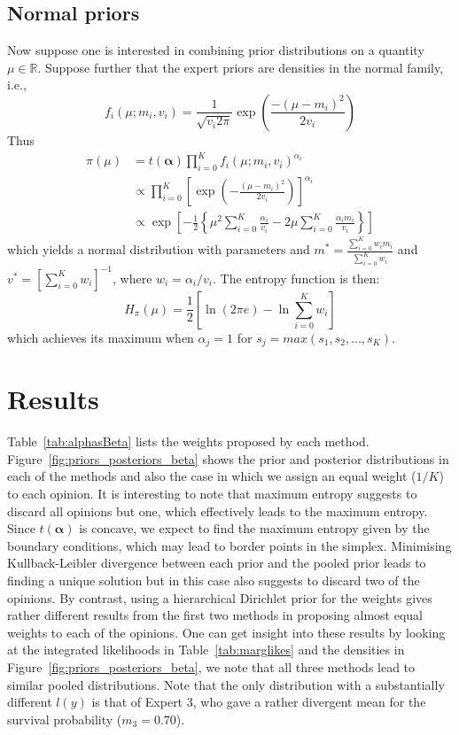 \documentclass[a4paper, notitlepage, 10pt]{article}
\begin{document}
\subsection*{Normal priors} %
\label{sec:normal}
Now suppose one is interested in combining prior distributions on a quantity $\mu \in \mathbb{R}$.
Suppose further that the expert priors are densities in the normal family, i.e.,
$$ f_i(\mu; m_i, v_i) = \frac{1}{\sqrt{v_i2\pi}} \exp\left(\frac{-(\mu-m_i)^2}{2v_i}\right) $$
Thus 
\begin{align}
\pi(\mu)&= t(\boldsymbol\alpha)\prod_{i=0}^{K}f_i(\mu; m_i, v_i)^{\alpha_i}\\
 &\propto \prod_{i=0}^{K} \left[ \exp \left(-\frac{(\mu-m_i)^2}{2v_i} \right) \right]^{\alpha_i} \\
&\propto \exp\left[-\frac{1}{2}\left\{\mu^2 \sum_{i=0}^K\frac{\alpha_i}{v_i} - 2 \mu \sum_{i=0}^K \frac{\alpha_i m_i}{v_i} \right\} \right] %
\end{align}
which yields a normal distribution with parameters and $m^* = \frac{\sum_{i=0}^K w_i m_i}{\sum_{i=0}^K w_i}$ and $v^* = [\sum_{i=0}^K w_i]^{-1}$,  where $w_i = \alpha_i/v_i$.
The entropy function is then:
\begin{equation}
 \label{eq:normalpoolentropy}
 H_{\pi}(\mu) = \frac{1}{2}\left[ \ln(2\pi e) - \ln\sum_{i=0}^K w_i\right]
\end{equation}
which achieves its maximum when $\alpha_j = 1$ for $s_j = max(s_1, s_2, \ldots, s_K)$.


\section*{Results} %

Table~\ref{tab:alphasBeta} lists the weights proposed by each method.
Figure~\ref{fig:priors_posteriors_beta} shows the prior and posterior distributions in each of the methods and also the case in which we assign an equal weight ($1/K$) to each opinion.
It is interesting to note that maximum entropy suggests to discard all opinions but one, which effectively leads to the maximum entropy.
Since $t(\boldsymbol\alpha)$ is concave, we expect to find the maximum entropy given by the boundary conditions, which may lead to border points in the simplex.
Minimising Kullback-Leibler divergence between each prior and the pooled prior leads to finding a unique solution but in this case also suggests to discard two of the opinions.
By contrast, using a hierarchical Dirichlet prior for the weights gives rather different results from the first two methods in proposing almost equal weights to each of the opinions.
One can get insight into these results by looking at the integrated likelihoods in Table~\ref{tab:marglikes} and the densities in Figure~\ref{fig:priors_posteriors_beta}, we note that all three methods lead  to similar pooled distributions.
Note that the only distribution with a substantially different $l(y)$ is that of Expert 3, who gave a rather divergent mean for the survival probability ($m_3=0.70$).
\end{document}
